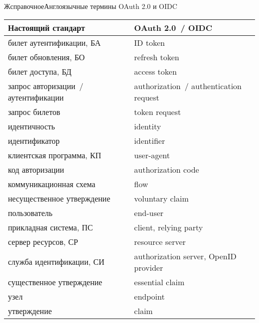 \begin{appendix}{Ж}{справочное}{Англоязычные термины OAuth 2.0 и OIDC}\label{ENG}

\mbox{}

\begin{center}
\begin{tabular}{|p{8cm}|p{8cm}|}
\hline
Настоящий стандарт & OAuth 2.0~/ OIDC\\
\hline
\hline
билет аутентификации, БА & ID token\\
билет обновления, БО & refresh token\\
билет доступа, БД & access token\\
запрос авторизации~/ аутентификации & 
authorization~/ authentication request\\
запрос билетов & token request\\
идентичность & identity\\
идентификатор & identifier\\
клиентская программа, КП & user-agent\\
код авторизации & authorization code\\
коммуникационная схема & flow\\
несущественное утверждение & voluntary claim\\
пользователь & end-user\\
прикладная система, ПС & client, relying party\\
сервер ресурсов, СР & resource server\\
служба идентификации, СИ & authorization server, OpenID provider\\
существенное утверждение & essential claim\\
узел & endpoint\\
утверждение & claim\\
\hline
\end{tabular}
\end{center}

\end{appendix}